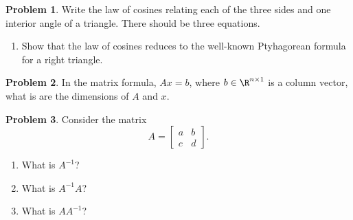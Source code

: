 \documentclass[10pt]{article}
\theoremstyle{definition}
\newtheorem{prob}{Problem}[section]
\newenvironment{subprob}%
{\renewcommand{\theenumi}{\alph{enumi}}\renewcommand{\labelenumi}{(\theenumi)}\begin{enumerate}}%
{\end{enumerate}}%
\begin{document}
\begin{prob}
Write the law of cosines relating each of the three sides and one interior angle of a triangle.
There should be three equations.
\begin{figure}[h]
    \centering
{}
\end{figure}
\begin{subprob}
\item Show that the law of cosines reduces to the well-known Ptyhagorean formula for a right triangle.
\end{subprob}
\end{prob}

\begin{prob}
    In the matrix formula, \( A x = b \), where \( b \in \R^{n\times1} \) is a column vector, what is are the dimensions of \( A \) and \(x \).
\end{prob}

\begin{prob}
    Consider the matrix 
    \begin{equation}
    A = \begin{bmatrix} a & b \\ c & d \end{bmatrix}.
    \end{equation}
    \begin{subprob}
    \item What is \( A^{-1} \)?
    \item What is \( A^{-1} A \)?
    \item What is \( A A^{-1} \)?
    \end{subprob}
\end{prob}
\end{document}
